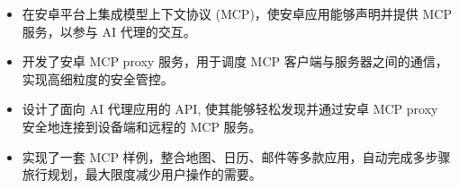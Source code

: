 


\begin{itemize}[nosep]
  \item 在安卓平台上集成模型上下文协议 (MCP)，使安卓应用能够声明并提供 MCP 服务，以参与 AI 代理的交互。
  \item 开发了安卓 MCP proxy 服务，用于调度 MCP 客户端与服务器之间的通信，实现高细粒度的安全管控。
  \item 设计了面向 AI 代理应用的 API, 使其能够轻松发现并通过安卓 MCP proxy 安全地连接到设备端和远程的 MCP 服务。
  \item 实现了一套 MCP 样例，整合地图、日历、邮件等多款应用，自动完成多步骤旅行规划，最大限度减少用户操作的需要。
\end{itemize}
